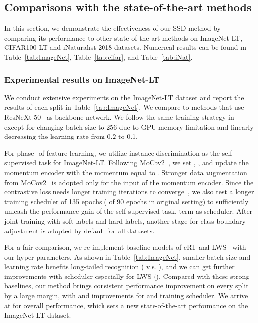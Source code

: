 \documentclass[10pt,twocolumn,letterpaper]{article}
\begin{document}
\subsection{Comparisons with the state-of-the-art methods}
\label{subsec:comp_sota}
In this section, we demonstrate the effectiveness of our SSD method by comparing its performance to other state-of-the-art methods on ImageNet-LT, CIFAR100-LT and iNaturalist 2018 datasets. Numerical results can be found in Table~\ref{tab:ImageNet}, Table~\ref{tab:cifar}, and Table~\ref{tab:iNat}.

\subsubsection{Experimental results on ImageNet-LT}

We conduct extensive experiments on the ImageNet-LT dataset and report the results of each split in Table~\ref{tab:ImageNet}. We compare to methods that use ResNeXt-50~\cite{ResNext} as backbone network. We follow the same training strategy in \cite{decoupling} except for changing batch size to 256 due to GPU memory limitation and linearly decreasing the learning rate from 0.2 to 0.1.

For phase-\uppercase\expandafter{} of feature learning, we utilize instance discrimination as the self-supervised task for ImageNet-LT. Following MoCov2~\cite{strongmoco}, we set , , and update the momentum encoder with the momentum equal to . Stronger data augmentation from MoCov2~\cite{strongmoco} is adopted only for the input of the momentum encoder. Since the contrastive loss needs longer training iterations to converge~\cite{moco, simclr}, we also test a longer training scheduler of 135 epochs ( of 90 epochs in original setting) to sufficiently unleash the performance gain of the self-supervised task, term as  scheduler. After joint training with soft labels and hard labels, another stage for class boundary adjustment is adopted by default for all datasets.

For a fair comparison, we re-implement baseline models of cRT and LWS~\cite{decoupling} with our hyper-parameters. As shown in Table~\ref{tab:ImageNet}, smaller batch size and learning rate benefits long-tailed recognition ( v.s. ), and we can get further improvements with  scheduler especially for LWS (). Compared with these strong baselines, our method brings consistent performance improvement on every split by a large margin, with  and  improvements for  and  training scheduler. We arrive at  for overall performance, which sets a new state-of-the-art performance on the ImageNet-LT dataset.
\end{document}
